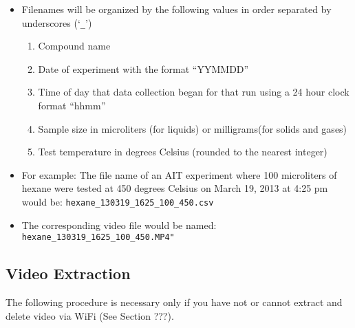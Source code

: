 \begin{itemize}
  \begin{itemize}
  \item
    Filenames will be organized by the following values in order
    separated by underscores (`\texttt{\_}')

    \begin{enumerate}
    \def\labelenumi{\arabic{enumi}.}
    \tightlist
    \item
      Compound name
    \item
      Date of experiment with the format ``YYMMDD''
    \item
      Time of day that data collection began for that run using a 24
      hour clock format ``hhmm''
    \item
      Sample size in microliters (for liquids) or milligrams(for solids
      and gases)
    \item
      Test temperature in degrees Celsius (rounded to the nearest
      integer)
    \end{enumerate}
  \item
    For example: The file name of an AIT experiment where 100
    microliters of hexane were tested at 450 degrees Celsius on March
    19, 2013 at 4:25 pm would be:
    \texttt{hexane\_130319\_1625\_100\_450.csv}
  \item
    The corresponding video file would be named:
    \texttt{hexane\_130319\_1625\_100\_450.MP4"}
  \end{itemize}
\end{itemize}

\hypertarget{video-extraction}{%
\subsection{Video Extraction}\label{video-extraction}}

The following procedure is necessary only if you have not or cannot
extract and delete video via WiFi (See Section ???).

